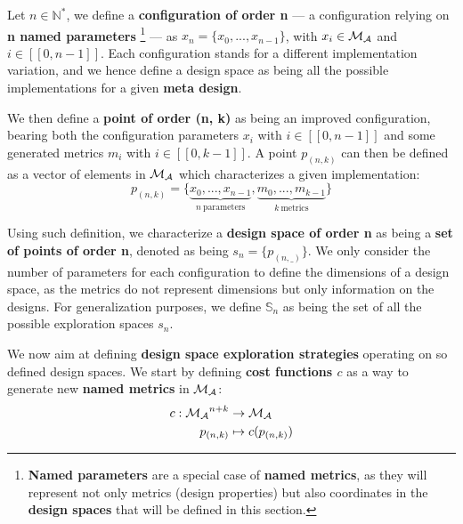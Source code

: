             Let $n \in \mathbb{N^*}$, we define a {\bf configuration of order n} --- \ie a configuration relying on {\bf n named parameters}%
            \footnote{{\bf Named parameters} are a special case of {\bf named metrics}, as they will represent not only metrics (\ie design properties) but also coordinates in the {\bf design spaces} that will be defined in this section.} %
            --- as $x_n = \{x_0, ..., x_{n-1}\}$, with $x_i \in \cal{M}_{\cal{A}}$ and $i \in [\![0, n-1]\!]$.
            Each configuration stands for a different implementation variation, and we hence define a design space as being all the possible implementations for a given {\bf meta design}.

            We then define a {\bf point of order (n, k)} as being an improved configuration, bearing both the configuration parameters $x_i$ with $i \in [\![0, n-1]\!]$ and some generated metrics $m_i$ with $i \in [\![0, k-1]\!]$.
            A point $p_{(n, k)}$ can then be defined as a vector of elements in $\cal{M}_{\cal{A}}$ which characterizes a given implementation: 
            \begin{equation}
                \label{ch.dse:sec.functional:ssec.formalization:eq.point}
                p_{(n, k)} = \{\underbrace{x_0, ..., x_{n-1}}_{n\: \text{parameters}}, \underbrace{m_0, ..., m_{k-1}}_{k\: \text{metrics}}\}
            \end{equation}

            Using such definition, we characterize a {\bf design space of order n} as being a {\bf set of points of order n}, denoted as being $s_n = \{p_{(n, \_)}\}$.
            We only consider the number of parameters for each configuration to define the dimensions of a design space, as the metrics do not represent dimensions but only information on the designs.
            For generalization purposes, we define $\mathbb{S}_n$ as being the set of all the possible exploration spaces $s_n$.

   
\clearpage
            We now aim at defining {\bf design space exploration strategies} operating on so defined design spaces.
            We start by defining {\bf cost functions $c$} as a way to generate new {\bf named metrics} in $\cal{M}_{\cal{A}}$:
            \begin{equation}
                \label{ch.dse:sec.functional:ssec.formalization:eq.costFunction}
                \begin{split}
			c: {\cal{M}_{\cal{A}}}^{n+k} & \rightarrow {\cal{M}_{\cal{A}}}\\
			p_{(n,k)} & \mapsto c(p_{(n,k)})
                \end{split}
            \end{equation}
            
